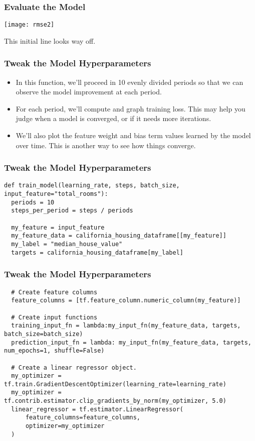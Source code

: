 \begin{frame}[fragile]\frametitle{Evaluate the Model}
\begin{center}
\texttt{[image: rmse2]}
\end{center}
This initial line looks way off. 
\end{frame}

\begin{frame}[fragile]\frametitle{Tweak the Model Hyperparameters}
\begin{itemize}
\item In this function, we'll proceed in 10 evenly divided periods so that we can observe the model improvement at each period.
\item 
For each period, we'll compute and graph training loss. This may help you judge when a model is converged, or if it needs more iterations.
\item 
We'll also plot the feature weight and bias term values learned by the model over time. This is another way to see how things converge.
\end{itemize}

\end{frame}

\begin{frame}[fragile]\frametitle{Tweak the Model Hyperparameters}
\begin{lstlisting}
def train_model(learning_rate, steps, batch_size, input_feature="total_rooms"):
  periods = 10
  steps_per_period = steps / periods

  my_feature = input_feature
  my_feature_data = california_housing_dataframe[[my_feature]]
  my_label = "median_house_value"
  targets = california_housing_dataframe[my_label]
\end{lstlisting}
\end{frame}

\begin{frame}[fragile]\frametitle{Tweak the Model Hyperparameters}
\begin{lstlisting}
  # Create feature columns
  feature_columns = [tf.feature_column.numeric_column(my_feature)]
  
  # Create input functions
  training_input_fn = lambda:my_input_fn(my_feature_data, targets, batch_size=batch_size)
  prediction_input_fn = lambda: my_input_fn(my_feature_data, targets, num_epochs=1, shuffle=False)
  
  # Create a linear regressor object.
  my_optimizer = tf.train.GradientDescentOptimizer(learning_rate=learning_rate)
  my_optimizer = tf.contrib.estimator.clip_gradients_by_norm(my_optimizer, 5.0)
  linear_regressor = tf.estimator.LinearRegressor(
      feature_columns=feature_columns,
      optimizer=my_optimizer
  )

\end{lstlisting}
\end{frame}

